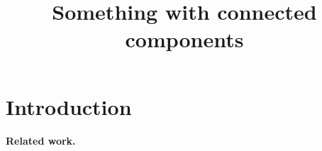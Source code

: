 \documentclass[letterpaper]{article}
\title{Something with connected components}
\newcommand{\mypar}[1]{{\bf #1.}}
\begin{document}
%
\maketitle


\begin{abstract}
\end{abstract}

\section{Introduction}\label{sec:intro}






\mypar{Related work}
\end{document}
